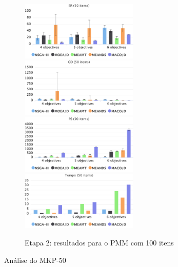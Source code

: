 \begin{figure}[!htbp]
	\caption{Etapa 2: resultados para o PMM com 100 itens}
	\label{fig_exp2_mkp_100}
	\includegraphics[width=0.5\textwidth]{cap_experimentos/figs/etapa2/er-mkp-50}
	\includegraphics[width=0.5\textwidth]{cap_experimentos/figs/etapa2/gd-mkp-50}
	\includegraphics[width=0.5\textwidth]{cap_experimentos/figs/etapa2/ps-mkp-50}
	\includegraphics[width=0.5\textwidth]{cap_experimentos/figs/etapa2/time-mkp-50}
\end{figure}

Análise do MKP-50

